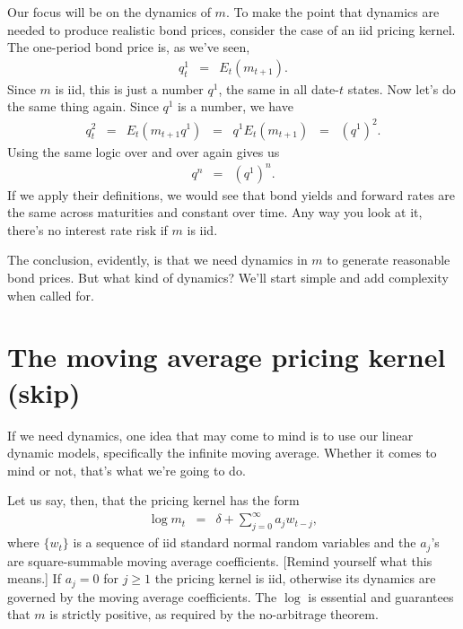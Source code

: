 \documentclass[11pt]{article}
\begin{document}
Our focus will be on the dynamics of $m$.
To make the point that dynamics are needed to produce realistic
bond prices, consider the case of an iid pricing kernel.
The one-period bond price is, as we've seen,
\begin{eqnarray*}
    q^{1}_t &=& E_t \left( m_{t+1} \right) .
\end{eqnarray*}
Since $m$ is iid, this is just a number $q^1$,
the same in all date-$t$ states.
%
Now let's do the same thing again.
Since $q^1 $ is a number, we have
\begin{eqnarray*}
    q^{2}_t &=& E_t \left( m_{t+1} q^1 \right)
            \;\;=\;\;  q^1 E_t \left( m_{t+1}  \right)
            \;\;=\;\;  (q^1)^2 .
\end{eqnarray*}
Using the same logic over and over again gives us
\begin{eqnarray*}
    q^{n} &=& (q^1)^n .
\end{eqnarray*}
If we apply their definitions,
we would see that bond yields and forward rates are the same across maturities
and constant over time.
Any way you look at it, there's no interest rate risk if $m$ is iid.

The conclusion, evidently, is that we need dynamics in $m$
to generate reasonable bond prices.
But what kind of dynamics?
We'll start simple and add complexity when called for.


\section{The moving average pricing kernel (skip)}

If we need dynamics, one idea that may come to mind is to use
our linear dynamic models, specifically the infinite moving average.
Whether it comes to mind or not, that's what we're going to do.

Let us say, then, that the pricing kernel has the form
\begin{eqnarray}
    \log m_t &=& \delta + \sum_{j=0}^\infty a_j w_{t-j} ,
    \label{eq:logm-ma}
\end{eqnarray}
where $\{ w_t \} $ is a sequence of iid standard normal random variables and
the $a_j$'s are square-summable moving average coefficients.
[Remind yourself what this means.]
If $a_j = 0$ for $j \geq 1$ the pricing kernel is iid,
otherwise its dynamics
are governed by the moving average coefficients.
The $\log$ is essential and guarantees that $m$ is strictly positive,
as required by the no-arbitrage theorem.
\end{document}
